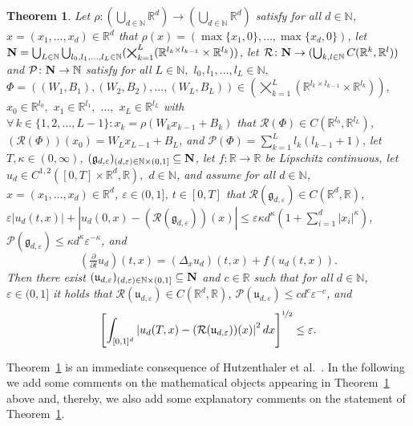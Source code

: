 \documentclass[12pt]{article}
\newtheorem{theorem}{Theorem}
\theoremstyle{definition}
\newcommand{\R}{\mathbb{R}}
\newcommand{\N}{\mathbb{N}}
\begin{document}
\begin{theorem}
\label{thm:DNN_nonlinear_PDEs}
Let $ \rho \colon (\bigcup_{d\in\N}\R^d) \to (\bigcup_{d\in\N}\R^d)$ 
satisfy for all $d\in\N $, $ x = (x_1,\dots,x_d) \in \R^d $ 
that 
$
  \rho(x) = ( \max\{x_1,0\}, \allowbreak \dots, \allowbreak\max\{x_d,0\} ) 
$, 
let $
  {\bf N} = 
  \bigcup_{ L \in \N }
  \bigcup_{ l_0, l_1, \dots, l_L \in \N }(
    \bigtimes_{ k = 1 }^L ( \R^{ l_k \times l_{k-1} } \times \R^{l_k} )
  ) 
$, 
let 
$ \mathcal{R} \colon {\bf N} \to (\bigcup_{k,l\in\N}C(\R^k,\R^l)) $ 
and 
$
  \mathcal{P} \colon {\bf N} \to \N 
$ 
satisfy for all $L\in\N,$ $l_0,l_1,\dots,l_L\in\N,$ $\Phi = ((W_1,B_1),\allowbreak(W_2,B_2),\allowbreak\dots,\allowbreak(W_L,B_L)) \in (\bigtimes_{k=1}^L\allowbreak (\R^{l_k\times l_{k-1}}\times \R^{l_k})),$ $x_0\in \R^{l_0},$ $x_1\in\R^{l_1},$ $\dots,$ $x_L\in\R^{l_L}$ with $\forall\, k\in \{1,2,\dots,L-1\}\colon x_k = \rho( W_k x_{ k - 1 } + B_k ) $ that
$
  \mathcal{R}(\Phi) \in C(\R^{l_0},\R^{l_{L}})
$, 
$
  (\mathcal{R}(\Phi))(x_0) = W_Lx_{L-1}+B_L
$, 
and
$
  \mathcal{P}(\Phi) = \sum_{k=1}^L l_k(l_{k-1}+1)
$, 
let $ T, \kappa \in (0,\infty) $, 
$ (\mathfrak{g}_{d,\varepsilon} )_{ (d,\varepsilon) \in \N \times (0,1] } \subseteq {\bf N} $, 
let $f\colon\R \to \R$ be Lipschitz continuous, 
let $u_d \in C^{1,2}([0,T]\times \R^d,\R),$ $d\in\N$, 
and assume for all 
$ d \in \N $, $ x = (x_1, \dots, x_d) \in \R^d $, 
$ \varepsilon \in (0,1] $, $ t \in [0,T] $ 
that 
$
  \mathcal{R}(\mathfrak{g}_{d,\varepsilon}) \in C(\R^d,\R) 
$, 
$ 
  \varepsilon | u_d(t,x) | 
  + \allowbreak 
  | u_d(0,x) \allowbreak - ( \mathcal{R}(\mathfrak{g}_{d,\varepsilon}) )(x) | 
  \le \varepsilon \kappa d^\kappa (1 + \sum_{ i = 1 }^d | x_i |^\kappa ) 
$, 
$
  \mathcal{P}(\mathfrak{g}_{d,\varepsilon}) \le \kappa d^\kappa \varepsilon^{-\kappa} 
$, 
and 
\begin{equation}\label{eq:1a}
  (\tfrac{\partial}{\partial t} u_d)(t,x) = (\Delta_x u_d)(t,x) + f(u_d(t,x)) .
\end{equation}
Then there exist 
$ (\mathfrak{u}_{d,\varepsilon})_{(d,\varepsilon)\in \N\times(0,1] }\subseteq {\bf N} $
and $ c \in \R $ 
such that for all $ d \in \N $, $ \varepsilon \in (0,1] $ 
it holds that 
$ \mathcal{R}( \mathfrak{u}_{d,\varepsilon} ) \in C( \R^d, \R ) $, 
$ \mathcal{P}( \mathfrak{u}_{d,\varepsilon} ) \le c d^c \varepsilon^{-c} $, 
and
\begin{equation}\label{eq:2a}
  \left[ 
    \int_{ [0,1]^d } 
      \left| 
        u_d(T,x) - (\mathcal{R}(\mathfrak{u}_{d,\varepsilon}))(x) 
      \right|^2 
    dx
  \right]^{\nicefrac{1}{2}} \le \varepsilon.
\end{equation}
\end{theorem}
%
%
%
Theorem~\ref{thm:DNN_nonlinear_PDEs} is an immediate 
consequence of 
Hutzenthaler et al.~\cite[Theorem~1.1]{hutzenthaler2020proof}. 
In the following we add some comments 
on the mathematical objects 
appearing in Theorem~\ref{thm:DNN_nonlinear_PDEs} above and, thereby, we 
also add some explanatory comments on the statement of Theorem~\ref{thm:DNN_nonlinear_PDEs}.
\end{document}
